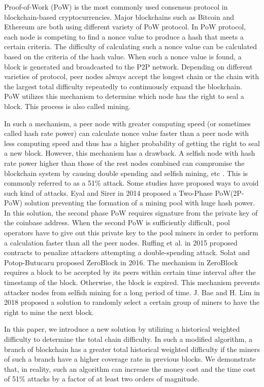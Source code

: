 \documentclass[conference]{IEEEtran}
\begin{document}
Proof-of-Work (PoW) is the most commonly used consensus protocol in blockchain-based cryptocurrencies. Major blockchains such as Bitcoin and Ethereum are both using different variety of PoW protocol. In PoW protocol, each node is competing to find a nonce value to produce a hash that meets a certain criteria. The difficulty of calculating such a nonce value can be calculated based on the criteria of the hash value. When such a nonce value is found, a block is generated and broadcasted to the P2P network. Depending on different varieties of protocol, peer nodes always accept the longest chain or the chain with the largest total difficulty repeatedly to continuously expand the blockchain. PoW utilizes this mechanism to determine which node has the right to seal a block. This process is also called mining.

In such a mechanism, a peer node with greater computing speed (or sometimes called hash rate power) can calculate nonce value faster than a peer node with less computing speed and thus has a higher probability of getting the right to seal a new block. However, this mechanism has a drawback. A selfish node with hash rate power higher than those of the rest nodes combined can compromise the blockchain system by causing double spending and selfish mining, etc \cite{b3}\cite{b4}. This is commonly referred to as a 51\% attack. Some studies have proposed ways to avoid such kind of attacks. Eyal and Sirer \cite{b5} in 2014 proposed a Two-Phase PoW(2P-PoW) solution preventing the formation of a mining pool with huge hash power. In this solution, the second phase PoW requires signature from the private key of the coinbase address. When the second PoW is sufficiently difficult, pool operators have to give out this private key to the pool miners in order to perform a calculation faster than all the peer nodes. Ruffing et al. \cite{b6} in 2015 proposed contracts to penalize attackers attempting a double-spending attack. Solat and Potop-Butucaru proposed ZeroBlock \cite{b7} in 2016. The mechanism in ZeroBlock requires a block to be accepted by its peers within certain time interval after the timestamp of the block. Otherwise, the block is expired. This mechanism prevents attacker nodes from selfish mining for a long period of time. J. Bae and H. Lim \cite{b8} in 2018 proposed a solution to randomly select a certain group of miners to have the right to mine the next block.

In this paper, we introduce a new solution by utilizing a historical weighted difficulty to determine the total chain difficulty. In such a modified algorithm, a branch of blockchain has a greater total historical weighted difficulty if the miners of such a branch have a higher coverage rate in previous blocks. We demonstrate that, in reality, such an algorithm can increase the money cost and the time cost of 51\% attacks by a factor of at least two orders of magnitude.
\end{document}
